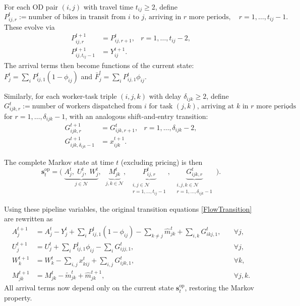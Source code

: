 \documentclass[trsc,nonblindrev]{informs3noheader}
\begin{document}
For each OD pair $(i,j)$ with travel time $t_{ij}\ge 2$, define
\[
    P_{ij,r}^t := \text{number of bikes in transit from $i$ to $j$, arriving in $r$ more periods},
    \quad r=1,\ldots,t_{ij}-1.
\]
These evolve via
\begin{align}
    P_{ij,r}^{t+1} &= P_{ij,r+1}^{t},
    &r=1,\ldots,t_{ij}-2, \label{eq:pipe-bike}\\
    P_{ij,t_{ij}-1}^{t+1} &= Y_{ij}^{t+1}. \nonumber
\end{align}
The arrival terms then become functions of the current state: $F_j^t = \sum_i P_{ij,1}^t(1-\phi_{ij})$ and $\bar{F}_j^t = \sum_i P_{ij,1}^t\phi_{ij}$.

Similarly, for each worker-task triple $(i,j,k)$ with delay $\delta_{ijk}\ge 2$, define
\[
    G_{ijk,r}^t := \text{number of workers dispatched from $i$ for task $(j,k)$, arriving at $k$ in $r$ more periods},
\]
for $r=1,\ldots,\delta_{ijk}-1$, with an analogous shift-and-entry transition:
\begin{align}
    G_{ijk,r}^{t+1} &= G_{ijk,r+1}^{t},
    &r=1,\ldots,\delta_{ijk}-2, \label{eq:pipe-worker}\\
    G_{ijk,\delta_{ijk}-1}^{t+1} &= x_{ijk}^{t+1}. \nonumber
\end{align}

The complete Markov state at time $t$ (excluding pricing) is then
\begin{equation}\label{eq:state-op}
\boxed{
    \mathbf{s}_t^{\mathrm{op}} = \Big(\;
    \underbrace{A_j^t,\; U_j^t,\; W_j^t}_{j\in\mathcal{N}},\;\;
    \underbrace{M_{jk}^t}_{j,k\in\mathcal{N}},\;\;
    \underbrace{P_{ij,r}^t}_{\substack{i,j\in\mathcal{N}\\r=1,\ldots,t_{ij}-1}},\;\;
    \underbrace{G_{ijk,r}^t}_{\substack{i,j,k\in\mathcal{N}\\r=1,\ldots,\delta_{ijk}-1}}
    \;\Big).
}
\end{equation}

Using these pipeline variables, the original transition equations \eqref{FlowTransition} are rewritten as
\begin{subequations}\label{eq:transitions-rewrite}
\begin{align}
    A_j^{t+1}
    &= A_j^t - Y_j^t
    + \textstyle\sum_{i} P_{ij,1}^t(1-\phi_{ij})
    - \sum_{k\neq j} \hat{m}_{jk}^t
    + \sum_{i,k} G_{ikj,1}^t,
    &\quad \forall j, \label{eq:A-trans}\\[3pt]
    U_j^{t+1}
    &= U_j^t
    + \textstyle\sum_{i} P_{ij,1}^t\phi_{ij}
    - \sum_{i} G_{ijj,1}^t,
    &\quad \forall j, \\[3pt]
    W_k^{t+1}
    &= W_k^t
    - \textstyle\sum_{i,j} x_{kij}^t
    + \sum_{i,j} G_{ijk,1}^t,
    &\quad \forall k, \\[3pt]
    M_{jk}^{t+1}
    &= M_{jk}^t - \tilde{m}_{jk}^t + \hat{m}_{jk}^{t+1},
    &\quad \forall j,k. \label{eq:M-trans}
\end{align}
\end{subequations}
All arrival terms now depend only on the current state $\mathbf{s}_t^{\mathrm{op}}$, restoring the Markov property.
\end{document}
